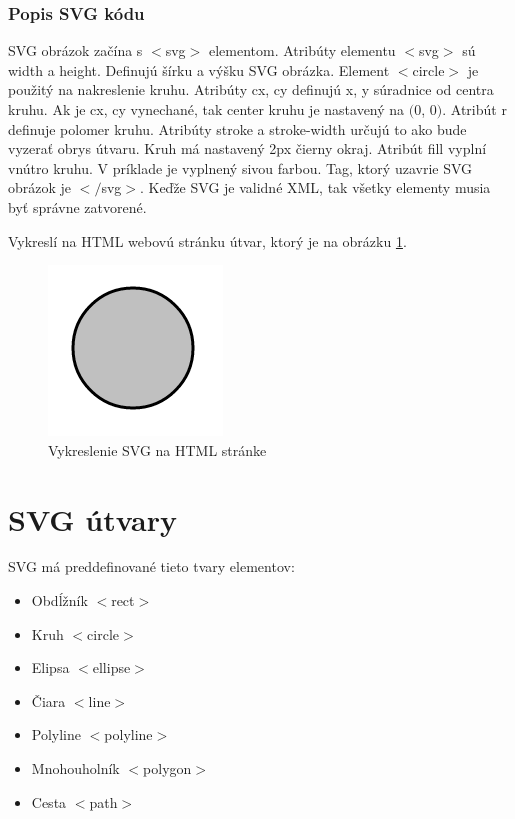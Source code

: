 \subsubsection{Popis  SVG kódu}

SVG obrázok začína s $<$svg$>$ elementom. Atribúty elementu $<$svg$>$ sú width a height. Definujú šírku a výšku SVG obrázka. Element $<$circle$>$ je použitý na nakreslenie kruhu. Atribúty cx, cy definujú x, y súradnice od centra kruhu. Ak je cx, cy vynechané, tak center kruhu je nastavený na $($0, 0$)$. Atribút r  definuje polomer kruhu. Atribúty stroke a stroke-width určujú to ako bude vyzerať obrys útvaru. Kruh má nastavený 2px čierny okraj. 
Atribút fill vyplní vnútro kruhu. V príklade je vyplnený sivou farbou. Tag, ktorý uzavrie SVG obrázok je $<$$/$svg$>$. Keďže SVG je validné XML, tak všetky elementy musia byť správne zatvorené. 


Vykreslí na HTML webovú stránku útvar, ktorý je na obrázku \ref{jednoduchyKruh}.

\begin{figure}[ht]
	\begin{center}
		\includegraphics  {obrazky/jednoduchyKruh.png}
		\caption{Vykreslenie SVG na HTML stránke}
		\label{jednoduchyKruh}
	\end{center}
\end{figure}


\section{SVG útvary} 

\acs*{SVG} má preddefinované tieto tvary elementov:
\begin{itemize}
	\item Obdĺžník $<$rect$>$
	\item Kruh $<$circle$>$
	\item Elipsa $<$ellipse$>$
	\item Čiara $<$line$>$
	\item Polyline $<$polyline$>$
	\item Mnohouholník $<$polygon$>$
	\item Cesta $<$path$>$	
\end{itemize}

